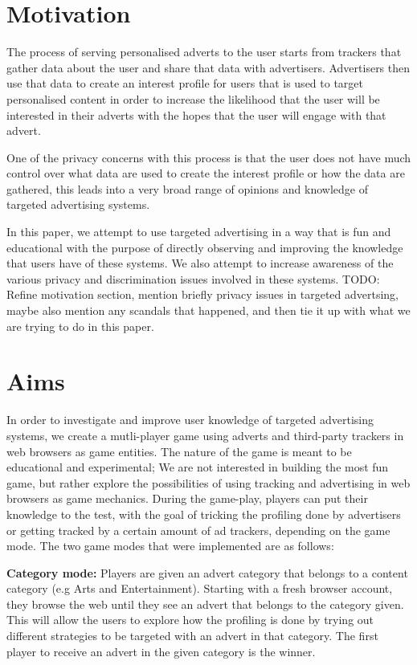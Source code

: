 \documentclass{l4proj}
\begin{document}
\section{Motivation}
The process of serving personalised adverts to the user starts from trackers that gather data about the user and share that data with advertisers. Advertisers then use that data to create an interest profile for users that is used to target personalised content in order to increase the likelihood that the user will be interested in their adverts with the hopes that the user will engage with that advert.

One of the privacy concerns with this process is that the user does not have much control over what data are used to create the interest profile or how the data are gathered, this leads into a very broad range of opinions and knowledge of targeted advertising systems.

In this paper, we attempt to use targeted advertising in a way that is fun and educational with the purpose of directly observing and improving the knowledge that users have of these systems. We also attempt to increase awareness of the various privacy and discrimination issues involved in these systems.
TODO: Refine motivation section, mention briefly privacy issues in targeted advertsing, maybe also mention any scandals that happened, and then tie it up with what we are trying to do in this paper.

\section{Aims}
In order to investigate and improve user knowledge of targeted advertising systems, we create a mutli-player game using adverts and third-party trackers in web browsers as game entities. The nature of the game is meant to be educational and experimental; We are not interested in building the most fun game, but rather explore the possibilities of using tracking and advertising in web browsers as game mechanics. During the game-play, players can put their knowledge to the test, with the goal of tricking the profiling done by advertisers or getting tracked by a certain amount of ad trackers, depending on the game mode. The two game modes that were implemented are as follows:

\textbf{Category mode:} Players are given an advert category that belongs to a content category (e.g Arts and Entertainment). Starting with a fresh browser account, they browse the web until they see an advert that belongs to the category given. This will allow the users to explore how the profiling is done by trying out different strategies to be targeted with an advert in that category. The first player to receive an advert in the given category is the winner. 
\end{document}
